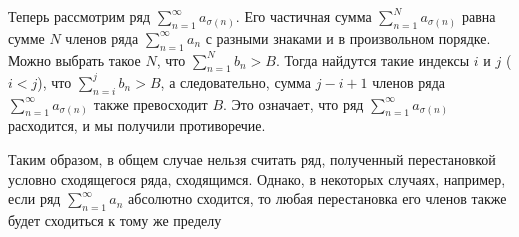 \documentclass[a4paper, 14pt]{article}
\begin{document}
    Теперь рассмотрим ряд $\sum_{n=1}^{\infty} a_{\sigma(n)}$.
    Его частичная сумма $\sum_{n=1}^{N} a_{\sigma(n)}$ равна сумме $N$ членов ряда $\sum_{n=1}^{\infty} a_n$ с
    разными знаками и в произвольном порядке.
    Можно выбрать такое $N$, что $\sum_{n=1}^{N} b_n > B$.
    Тогда найдутся такие индексы $i$ и $j$ ($i < j$), что $\sum_{n=i}^{j} b_n > B$, а следовательно, сумма $j-i+1$
    членов ряда $\sum_{n=1}^{\infty} a_{\sigma(n)}$ также превосходит $B$.
    Это означает, что ряд $\sum_{n=1}^{\infty} a_{\sigma(n)}$ расходится, и мы получили противоречие.

    Таким образом, в общем случае нельзя считать ряд, полученный перестановкой условно сходящегося ряда, сходящимся.
    Однако, в некоторых случаях, например, если ряд $\sum_{n=1}^{\infty} a_n$ абсолютно сходится, то любая
    перестановка его членов также будет сходиться к тому же пределу
\end{document}
